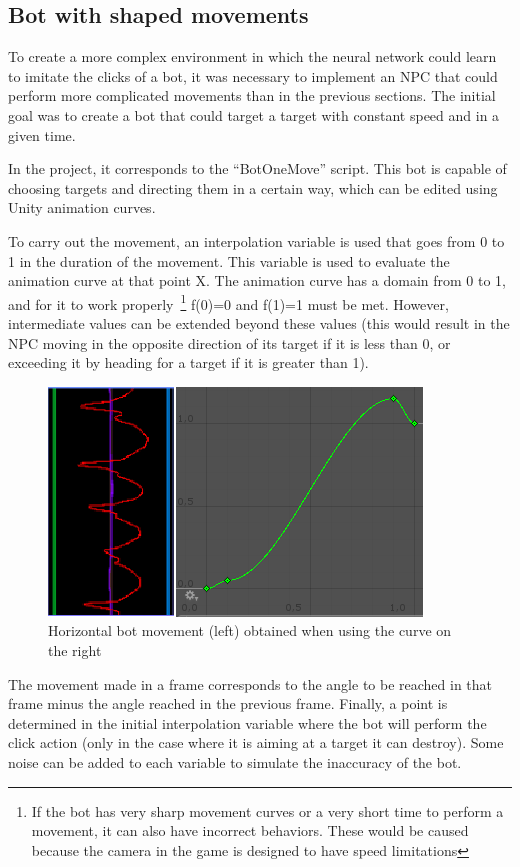 \subsection{Bot with shaped movements} %
\label{sec:botshaped}

To create a more complex environment in which the neural network could learn to imitate the clicks of a bot, it was necessary to implement an NPC that could perform more complicated movements than in the previous sections. The initial goal was to create a bot that could target a target with constant speed and in a given time.

In the project, it corresponds to the ``BotOneMove'' script. This bot is capable of choosing targets and directing them in a certain way, which can be edited using Unity animation curves.

To carry out the movement, an interpolation variable is used that goes from 0 to 1 in the duration of the movement. This variable is used to evaluate the animation curve at that point X. The animation curve has a domain from 0 to 1, and for it to work properly~\footnote{If the bot has very sharp movement curves or a very short time to perform a movement, it can also have incorrect behaviors. These would be caused because the camera in the game is designed to have speed limitations} f(0)=0 and f(1)=1 must be met. However, intermediate values can be extended beyond these values (this would result in the NPC moving in the opposite direction of its target if it is less than 0, or exceeding it by heading for a target if it is greater than 1).

\begin{figure}[h]
  \centering
		\includegraphics[width=.6\textwidth]{img/botMoveCurve.png}
  \caption{Horizontal bot movement (left) obtained when using the curve on the right}
  \label{fig:onemoveCurve}
\end{figure}


The movement made in a frame corresponds to the angle to be reached in that frame minus the angle reached in the previous frame. Finally, a point is determined in the initial interpolation variable where the bot will perform the click action (only in the case where it is aiming at a target it can destroy). Some noise can be added to each variable to simulate the inaccuracy of the bot.

